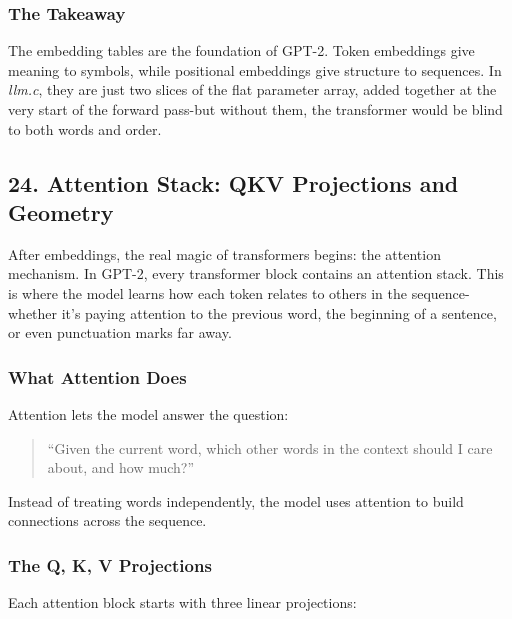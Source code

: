 \documentclass[
  letterpaper,
  DIV=11,
  numbers=noendperiod]{scrreprt}
\begin{document}
\subsubsection{The Takeaway}\label{the-takeaway-12}

The embedding tables are the foundation of GPT-2. Token embeddings give
meaning to symbols, while positional embeddings give structure to
sequences. In \emph{llm.c}, they are just two slices of the flat
parameter array, added together at the very start of the forward
pass-but without them, the transformer would be blind to both words and
order.

\subsection{24. Attention Stack: QKV Projections and
Geometry}\label{attention-stack-qkv-projections-and-geometry}

After embeddings, the real magic of transformers begins: the attention
mechanism. In GPT-2, every transformer block contains an attention
stack. This is where the model learns how each token relates to others
in the sequence-whether it's paying attention to the previous word, the
beginning of a sentence, or even punctuation marks far away.

\subsubsection{What Attention Does}\label{what-attention-does}

Attention lets the model answer the question:

\begin{quote}
``Given the current word, which other words in the context should I care
about, and how much?''
\end{quote}

Instead of treating words independently, the model uses attention to
build connections across the sequence.

\subsubsection{The Q, K, V Projections}\label{the-q-k-v-projections}

Each attention block starts with three linear projections:
\end{document}
